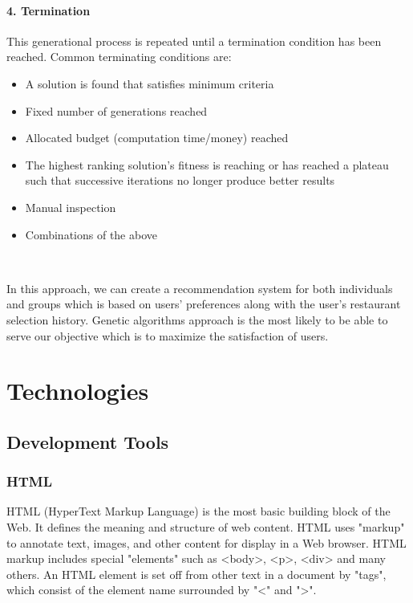 \documentclass[12pt,oneside,openright,a4paper]{cpe-english-project}
\begin{document}
\paragraph*{4. Termination}\cite{Geneticalgorithm}

This generational process is repeated until a termination condition has been reached. Common terminating conditions are:

\begin{itemize}
\item A solution is found that satisfies minimum criteria
\item Fixed number of generations reached
\item Allocated budget (computation time/money) reached
\item The highest ranking solution's fitness is reaching or has reached a plateau such that successive iterations no longer produce better results
\item Manual inspection
\item Combinations of the above
\end{itemize}

\

In this approach, we can create a recommendation system for both individuals and groups which is based on users’ preferences along with the user's restaurant selection history. Genetic algorithms approach is the most likely to be able to serve our objective which is to maximize the satisfaction of users.




\section{Technologies}

\subsection{Development Tools}

\subsubsection{HTML}

HTML (HyperText Markup Language) is the most basic building block of the Web. It defines the meaning and structure of web content. HTML uses "markup" to annotate text, images, and other content for display in a Web browser. HTML markup includes special "elements" such as <body>, <p>, <div> and many others. An HTML element is set off from other text in a document by "tags", which consist of the element name surrounded by "<" and ">". \cite{HTMLHyperTextMarkupLanguage}
\end{document}
